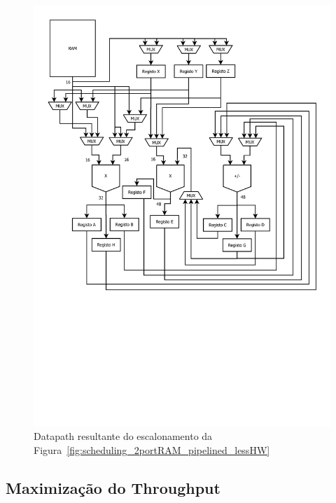 \documentclass[a4paper]{article}
\begin{document}
\begin{figure}[h]
\centering
\centerline{\includegraphics[trim=0 750 0 80, clip, width=\paperwidth]{datapath_pipelined_lessHW}}
\caption{Datapath resultante do escalonamento da Figura~\ref{fig:scheduling_2portRAM_pipelined_lessHW}}
\label{fig:datapath_pipelined_lessHW}
\end{figure}

\pagebreak
\subsection{Maximização do Throughput}
\label{subsec:arqui_2portRAM_maxthroughput}

\end{document}
